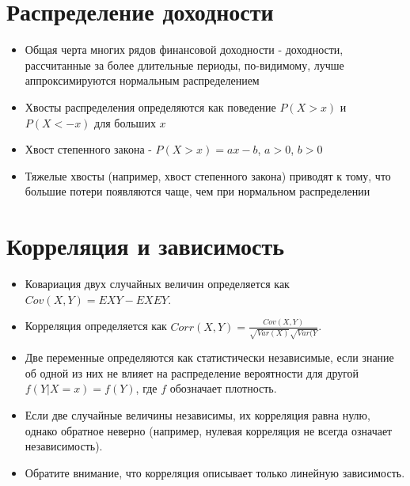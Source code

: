 \documentclass{article}
\begin{document}
\section{Распределение доходности}
\begin{itemize}
 теста Жарке-Бера используется для формальной проверки того, совместимы ли асимметрия выборки и эксцесс с предположением о нормальном распределении результатов.
\item Общая черта многих рядов финансовой доходности - доходности, рассчитанные за более длительные периоды, по-видимому, лучше аппроксимируются нормальным распределением
\item Хвосты распределения определяются как поведение $P(X>x)$ и $P(X<-x)$
для больших $x$
\item Хвост степенного закона - $P(X > x) = ax-b$, $a>0$, $b>0$
\item Тяжелые хвосты (например, хвост степенного закона) приводят к тому, что большие потери появляются чаще, чем при нормальном распределении
\end{itemize}

\section{Корреляция и зависимость}
\begin{itemize}
\item Ковариация двух случайных величин определяется как \(Cov(X,Y) = EXY - EXEY\).
\item Корреляция определяется как \(Corr (X, Y) = \frac{Cov(X,Y)}{\sqrt{Var(X)}\sqrt{Var(Y}}\).
\item Две переменные определяются как статистически независимые, если знание об одной из них не влияет на распределение вероятности для
другой \(f(Y|X = x) = f (Y)\), где $f$ обозначает плотность.
\item Если две случайные величины независимы, их корреляция равна нулю, однако обратное неверно (например, нулевая корреляция не всегда означает независимость).
\item Обратите внимание, что корреляция описывает только линейную зависимость.
\end{itemize}
\end{document}
